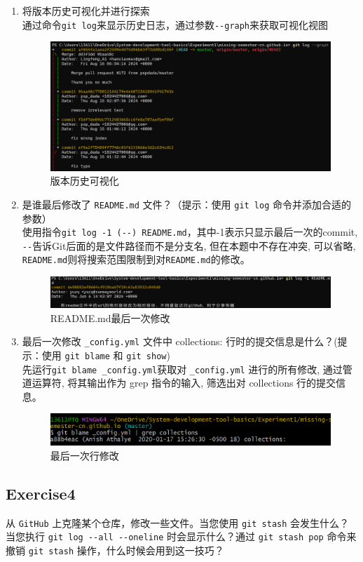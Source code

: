 \documentclass{article}
\begin{document}
            \begin{enumerate} 
                \item 将版本历史可视化并进行探索\\
                通过命令\verb|git log|来显示历史日志，通过参数\verb|--graph|来获取可视化视图
                \begin{figure}[H]
                    \centering
                    \includegraphics[scale=0.4]{1.png}
                    \caption{版本历史可视化}
                \end{figure}
                \item 是谁最后修改了 \verb|README.md| 文件？（提示：使用 \verb|git log| 命令并添加合适的参数）\\
                使用指令\verb|git log -1 (--) README.md|，其中-1表示只显示最后一次的commit, 
                \verb|--|告诉Git后面的是文件路径而不是分支名, 但在本题中不存在冲突, 可以省略, 
                \verb|README.md|则将搜索范围限制到对\verb|README.md|的修改。
                \begin{figure}[H]
                    \centering
                    \includegraphics[scale=0.35]{2.png}
                    \caption{README.md最后一次修改}
                \end{figure}
                \item 最后一次修改 \verb|_config.yml| 文件中 collections: 行时的提交信息是什么？(提示：使用 \verb|git blame| 和 \verb|git show|)\\
                先运行\verb |git blame _config.yml|获取对 \verb|_config.yml| 进行的所有修改, 
                通过管道运算符, 将其输出作为 grep 指令的输入, 筛选出对 collections 行的提交信息。
                \begin{figure}[H]
                    \centering
                    \includegraphics[scale=0.7]{3.png}
                    \caption{最后一次行修改}
                \end{figure}
            \end{enumerate}
        \subsection{Exercise4}
        从 \verb|GitHub| 上克隆某个仓库，修改一些文件。当您使用 \verb|git stash| 会发生什么？当您执行
        \verb|git log --all --oneline| 时会显示什么？通过 \verb|git stash pop| 命令来撤销
        \verb|git stash| 操作，什么时候会用到这一技巧？
\end{document}
